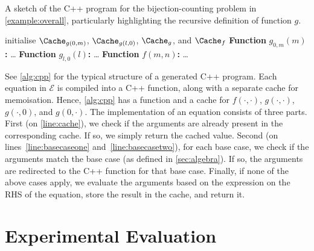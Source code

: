 \documentclass[a4paper,UKenglish,cleveref, autoref, thm-restate]{lipics-v2021}
\begin{document}
\begin{algorithm}[t]
  \caption{A sketch of the C++ program for the bijection-counting problem in \cref{example:overall}, particularly highlighting the recursive definition of function $g$.}\label{alg:cpp}
  initialise $\Cache_{g(0, m)}$, $\Cache_{g(l, 0)}$, $\Cache_{g}$, and $\Cache_{f}$\;
  \DontPrintSemicolon
  \textbf{Function} $g_{0,m}(m)$\textbf{:} \dots\;
  \textbf{Function} $g_{l,0}(l)$\textbf{:} \dots\;
  \PrintSemicolon
  \DontPrintSemicolon
  \textbf{Function} $f(m, n)$\textbf{:} \dots\;
  \PrintSemicolon
\end{algorithm}

See \cref{alg:cpp} for the typical structure of a generated C++ program. Each
equation in $\mathcal{E}$ is compiled into a C++ function, along with a separate
cache for memoisation. Hence, \cref{alg:cpp} has a function and a cache for
$f(\cdot, \cdot)$, $g(\cdot, \cdot)$, $g(\cdot, 0)$, and $g(0, \cdot)$. The
implementation of an equation consists of three parts. First (on
\autoref{line:cache}), we check if the arguments are already present in the
corresponding cache. If so, we simply return the cached value. Second (on
lines~\ref{line:basecaseone} and~\ref{line:basecasetwo}), for each base case, we
check if the arguments match the base case (as defined in \cref{sec:algebra}).
If so, the arguments are redirected to the C++ function for that base case.
Finally, if none of the above cases apply, we evaluate the arguments based on
the expression on the RHS of the equation, store the result in the cache, and
return it.

\section{Experimental Evaluation}\label{sec:experiments}



\end{document}
